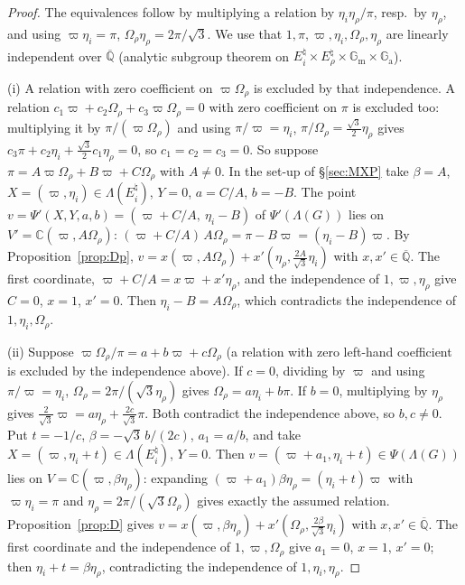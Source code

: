 \documentclass[11pt]{amsart}
\theoremstyle{definition}
\newcommand{\Qb}{\overline{\mathbb{Q}}}
\newcommand{\C}{\mathbb{C}}
\newcommand{\Ga}{\mathbb{G}_{\mathrm a}}
\newcommand{\Gm}{\mathbb{G}_{\mathrm m}}
\newcommand{\vp}{\varpi}
\begin{document}
\begin{proof}
The equivalences follow by multiplying a relation by $\eta_i\eta_\rho/\pi$, resp.\ by $\eta_\rho$, and using
$\vp\eta_i=\pi$, $\Omega_\rho\eta_\rho=2\pi/\sqrt3$. We use that $1,\pi,\vp,\eta_i,\Omega_\rho,\eta_\rho$ are linearly
independent over $\Qb$ (analytic subgroup theorem \cite{Wu89} on $E_i^\natural\times E_\rho^\natural\times\Gm\times\Ga$).

(i) A relation with zero coefficient on $\vp\Omega_\rho$ is excluded by that independence. A relation
$c_1\vp+c_2\Omega_\rho+c_3\vp\Omega_\rho=0$ with zero coefficient on $\pi$ is excluded too: multiplying it by
$\pi/(\vp\Omega_\rho)$ and using $\pi/\vp=\eta_i$, $\pi/\Omega_\rho=\tfrac{\sqrt3}{2}\eta_\rho$ gives
$c_3\pi+c_2\eta_i+\tfrac{\sqrt3}{2}c_1\eta_\rho=0$, so $c_1=c_2=c_3=0$. So suppose
$\pi=A\vp\Omega_\rho+B\vp+C\Omega_\rho$ with $A\ne0$. In the set-up of \S\ref{sec:MXP} take $\beta=A$,
$X=(\vp,\eta_i)\in\Lambda(E_i^\natural)$, $Y=0$, $a=C/A$, $b=-B$. The point $v=\Psi'(X,Y,a,b)=(\vp+C/A,\ \eta_i-B)$ of
$\Psi'(\Lambda(G))$ lies on $V'=\C(\vp,A\Omega_\rho)$: $(\vp+C/A)\,A\Omega_\rho=\pi-B\vp=(\eta_i-B)\vp$. By
Proposition~\ref{prop:Dp}, $v=x(\vp,A\Omega_\rho)+x'(\eta_\rho,\tfrac{2A}{\sqrt3}\eta_i)$ with $x,x'\in\Qb$. The first
coordinate, $\vp+C/A=x\vp+x'\eta_\rho$, and the independence of $1,\vp,\eta_\rho$ give $C=0$, $x=1$, $x'=0$. Then
$\eta_i-B=A\Omega_\rho$, which contradicts the independence of $1,\eta_i,\Omega_\rho$.

(ii) Suppose $\vp\Omega_\rho/\pi=a+b\vp+c\Omega_\rho$ (a relation with zero left-hand coefficient is excluded by the
independence above). If $c=0$, dividing by $\vp$ and using $\pi/\vp=\eta_i$, $\Omega_\rho=2\pi/(\sqrt3\eta_\rho)$ gives
$\Omega_\rho=a\eta_i+b\pi$. If $b=0$, multiplying by $\eta_\rho$ gives $\tfrac{2}{\sqrt3}\vp=a\eta_\rho+\tfrac{2c}{\sqrt3}\pi$. Both
contradict the independence above, so $b,c\ne0$. Put $t=-1/c$, $\beta=-\sqrt3\,b/(2c)$, $a_1=a/b$, and take
$X=(\vp,\eta_i+t)\in\Lambda(E_i^\natural)$, $Y=0$. Then $v=(\vp+a_1,\eta_i+t)\in\Psi(\Lambda(G))$ lies on
$V=\C(\vp,\beta\eta_\rho)$: expanding $(\vp+a_1)\beta\eta_\rho=(\eta_i+t)\vp$ with $\vp\eta_i=\pi$ and
$\eta_\rho=2\pi/(\sqrt3\Omega_\rho)$ gives exactly the assumed relation. Proposition~\ref{prop:D} gives
$v=x(\vp,\beta\eta_\rho)+x'(\Omega_\rho,\tfrac{2\beta}{\sqrt3}\eta_i)$ with $x,x'\in\Qb$. The first coordinate and the
independence of $1,\vp,\Omega_\rho$ give $a_1=0$, $x=1$, $x'=0$; then $\eta_i+t=\beta\eta_\rho$, contradicting the
independence of $1,\eta_i,\eta_\rho$.
\end{proof}
\end{document}

